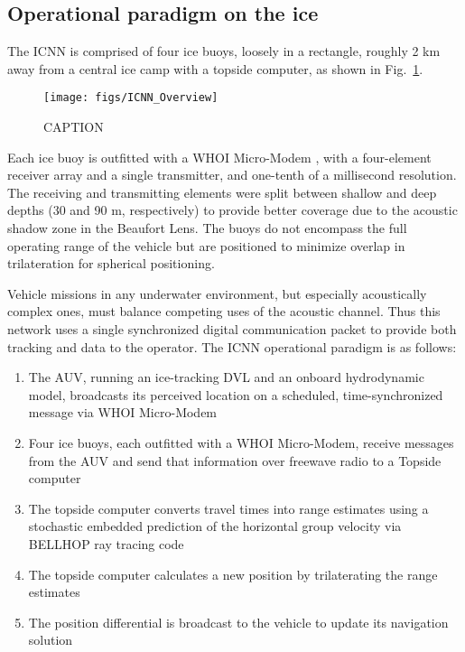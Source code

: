 \subsection{Operational paradigm on the ice}

The ICNN is comprised of four ice buoys, loosely in a rectangle, roughly 2 km away from a central ice camp with a topside computer, as shown in Fig.~\ref{fig:icnnOverview}.

\begin{figure}[h!]
	\centering
	\texttt{[image: figs/ICNN\_Overview]}
	\label{fig:icnnOverview}
	\caption{CAPTION}
\end{figure}

Each ice buoy is outfitted with a WHOI Micro-Modem \citep{singh_underwater_2006}, with a four-element receiver array and a single transmitter, and one-tenth of a millisecond resolution.
The receiving and transmitting elements were split between shallow and deep depths (30 and 90 m, respectively) to provide better coverage due to the acoustic shadow zone in the Beaufort Lens.
The buoys do not encompass the full operating range of the vehicle but are positioned to minimize overlap in trilateration for spherical positioning\citep{deffenbaugh_relationship_1996}.

Vehicle missions in any underwater environment, but especially acoustically complex ones, must balance competing uses of the acoustic channel.
Thus this network uses a single synchronized digital communication packet to provide both tracking and data to the operator.
The ICNN operational paradigm is as follows:
\begin{enumerate}
\item The AUV, running an ice-tracking DVL and an onboard hydrodynamic model, broadcasts its perceived location on a scheduled, time-synchronized message via WHOI Micro-Modem
\item Four ice buoys, each outfitted with a WHOI Micro-Modem, receive messages from the AUV and send that information over freewave radio to a Topside computer
\item The topside computer converts travel times into range estimates using a stochastic embedded prediction of the horizontal group velocity via BELLHOP ray tracing code \citep{porter_bellhop_2011}
\item The topside computer calculates a new position by trilaterating the range estimates
\item The position differential is broadcast to the vehicle to update its navigation solution
\end{enumerate}

